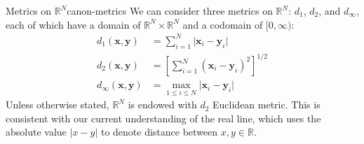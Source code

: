 \documentclass{article}
\renewcommand*\vec{\mathbf}
\numberwithin{equation}{section}
\numberwithin{figure}{section}
\begin{document}
\begin{definition}{Metrics on \texorpdfstring{$\mathbb{R}^N$}{an
        N-dimensional real vector space}}{canon-metrics}
    We can consider three metrics on $ \mathbb{R}^N $: $ d_1 $, $ d_2 $, and
    $ d_\infty $, each of which have a domain of $ \mathbb{R}^N \times
    \mathbb{R}^N $ and a codomain of $ [0, \infty) $:
    \begin{align}
        d_1(\vec{x}, \vec{y}) &= \sum_{i=1}^N \vert \vec{x}_i - \vec{y}_i
            \vert\label{eqn:d1-metric} \\
        d_2(\vec{x}, \vec{y}) &= \left[\sum_{i=1}^N (\vec{x}_i - \vec{y}_i)^2
            \right]^{1/2} \label{eqn:d2-metric} \\[.8em]
        d_\infty(\vec{x}, \vec{y}) &= \max_{1 \leq i \leq N} \vert \vec{x}_i -
            \vec{y}_i \vert\label{eqn:dinf-metric}
    \end{align}
    Unless otherwise stated, $ \mathbb{R}^N $ is endowed with $ d_2 $ Euclidean
    metric. This is consistent with our current understanding of the real line,
    which uses the absolute value $ \vert x - y \vert $ to denote distance
    between $ x, y \in \mathbb{R} $.
\end{definition}
\end{document}
